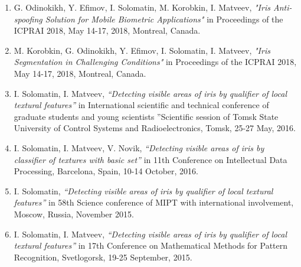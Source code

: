 \documentclass[a4paper,10pt]{article}
\begin{document}
\begin{enumerate}
\item G. Odinokikh, Y. Efimov, I. Solomatin, M. Korobkin, I. Matveev, \textit{"Iris Anti-spoofing Solution for Mobile Biometric Applications"} in Proceedings of the ICPRAI 2018, May 14-17, 2018, Montreal, Canada.
\item M. Korobkin, G. Odinokikh, Y. Efimov, I. Solomatin, I. Matveev, \textit{"Iris Segmentation in Challenging Conditions"} in Proceedings of the ICPRAI 2018, May 14-17, 2018, Montreal, Canada.
\item I. Solomatin, I. Matveev, \textit{“Detecting visible areas of iris by qualifier of local textural
features”} in International scientific and technical conference of graduate students and young scientists ”Scientific session of Tomsk State University of Control Systems and Radioelectronics, Tomsk, 25-27 May, 2016.
\item I. Solomatin, I. Matveev, V. Novik, \textit{“Detecting visible areas of iris by classifier of
textures with basic set”} in 11th Conference on Intellectual Data Processing, Barcelona, Spain, 10-14 October, 2016.
\item I. Solomatin, \textit{“Detecting visible areas of iris by qualifier of local textural features”} in 58th Science conference of MIPT with international involvement, Moscow, Russia, November 2015.
\item I. Solomatin, I. Matveev, \textit{“Detecting visible areas of iris by qualifier of local textural
features”} in 17th Conference on Mathematical Methods for Pattern Recognition, Svetlogorsk, 19-25 September, 2015.
\end{enumerate}

\end{document}
